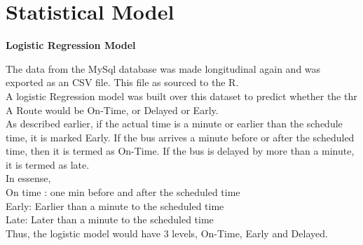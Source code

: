 \documentclass[12pt]{article}\usepackage[]{graphicx}\usepackage[]{color}
\begin{document}
\section{Statistical Model}
\textbf{Logistic Regression Model}

The data from the MySql database was made longitudinal again and was exported as an CSV file. This file as sourced to the R.\\

A logistic Regression model was built over this dataset to predict whether the thr A Route would be On-Time, or Delayed or Early.\\

As described earlier, if the actual time is a minute or earlier than the schedule time, it is marked Early. If the bus arrives a minute before or after the scheduled time, then it is termed as On-Time. If the bus is delayed by more than a minute, it is termed as late.\\

In essense,\\
On time : one min before and after the scheduled time\\
Early: Earlier than a minute to the scheduled time\\
Late: Later than a minute to the scheduled time\\

Thus, the logistic model would have 3 levels, On-Time, Early and Delayed.\\
\end{document}
